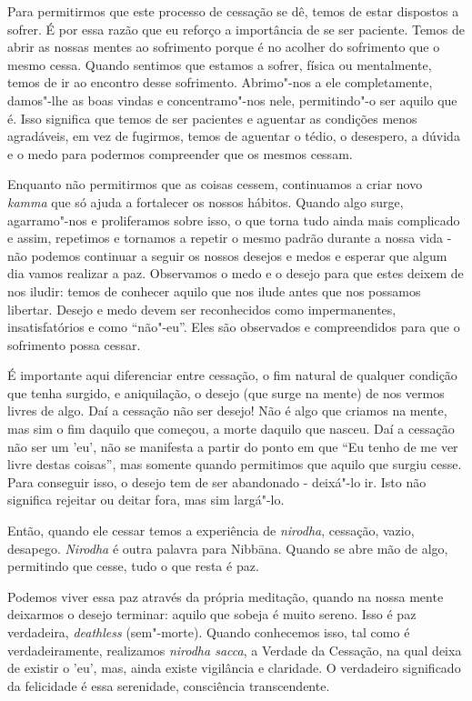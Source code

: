 Para permitirmos que este processo de cessação se dê, temos de estar dispostos a
sofrer. É por essa razão que eu reforço a importância de se ser paciente. Temos
de abrir as nossas mentes ao sofrimento porque é no acolher do sofrimento que o
mesmo cessa. Quando sentimos que estamos a sofrer, física ou mentalmente, temos
de ir ao encontro desse sofrimento. Abrimo"-nos a ele completamente, damos"-lhe
as boas vindas e concentramo"-nos nele, permitindo"-o ser aquilo que é. Isso
significa que temos de ser pacientes e aguentar as condições menos agradáveis,
em vez de fugirmos, temos de aguentar o tédio, o desespero, a dúvida e o medo para
podermos compreender que os mesmos cessam.

Enquanto não permitirmos que as coisas cessem, continuamos a criar novo
\emph{kamma} que só ajuda a fortalecer os nossos hábitos. Quando algo surge,
agarramo"-nos e proliferamos sobre isso, o que torna tudo ainda mais complicado 
e assim, repetimos e tornamos a repetir o mesmo padrão durante a nossa vida - não podemos
continuar a seguir os nossos desejos e medos e esperar que algum dia vamos realizar a paz.
Observamos o medo e o desejo para que estes deixem de nos iludir: temos de
conhecer aquilo que nos ilude antes que nos possamos libertar. Desejo e medo
devem ser reconhecidos como impermanentes, insatisfatórios e como “não"-eu”. Eles
são observados e compreendidos para que o sofrimento possa cessar.

É importante aqui diferenciar entre cessação, o fim natural de qualquer condição
que tenha surgido, e aniquilação, o desejo (que surge na mente) de nos vermos
livres de algo. Daí a cessação não ser desejo! Não é algo que criamos na mente,
mas sim o fim daquilo que começou, a morte daquilo que nasceu. Daí a cessação não
ser um 'eu', não se manifesta a partir do ponto em que “Eu tenho de me ver livre
destas coisas”, mas somente quando permitimos que aquilo que surgiu cesse. Para
conseguir isso, o desejo tem de ser abandonado - deixá"-lo ir. Isto não significa
rejeitar ou deitar fora, mas sim largá"-lo.

Então, quando ele cessar temos a experiência de \emph{nirodha}, cessação, vazio,
desapego. \emph{Nirodha} é outra palavra para Nibbāna. Quando se abre mão
de algo, permitindo que cesse, tudo o que resta é paz.

Podemos viver essa paz através da própria meditação, quando na nossa mente
deixarmos o desejo terminar: aquilo que sobeja é muito sereno. Isso é paz
verdadeira, \emph{deathless} (sem"-morte). Quando conhecemos isso, tal como é
verdadeiramente, realizamos \emph{nirodha sacca}, a Verdade da Cessação, na qual
deixa de existir o 'eu', mas, ainda existe vigilância e claridade. O verdadeiro
significado da felicidade é essa serenidade, consciência transcendente.

